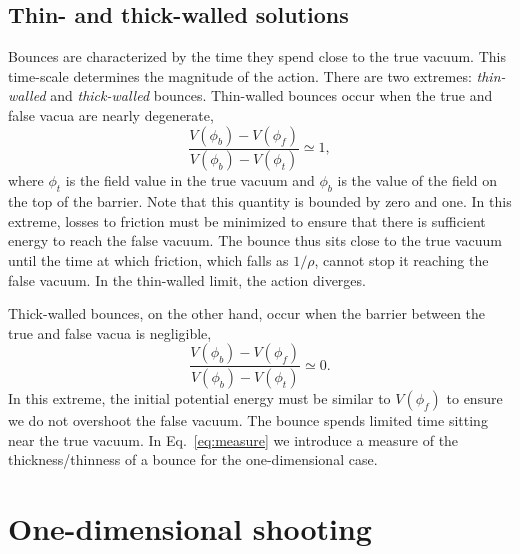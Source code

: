 \documentclass[final,3p,11pt,pdflatex]{elsarticle}
\renewcommand{\refeq}[1]{Eq.~\ref{#1}}
\newcommand{\fv}{\ensuremath{\phi_f}}
\newcommand{\tv}{\ensuremath{\phi_t}}
\newcommand{\barrier}{\ensuremath{\phi_b}}
\begin{document}
\subsection{Thin- and thick-walled solutions}

Bounces are characterized by the time they spend close to the true vacuum.  This time-scale determines the magnitude of the action. There are two extremes: \emph{thin-walled} and \emph{thick-walled} bounces.  Thin-walled bounces occur when the true and false vacua are nearly degenerate,
\begin{equation}
\frac{V(\barrier) - V(\fv)}{V(\barrier) - V(\tv)} \simeq 1,
\end{equation}
where $\tv$ is the field value in the true vacuum and $\barrier$ is the value
of the field on the top of the barrier.  Note that this quantity is bounded by
zero and one.  In this extreme, losses to friction must be minimized to ensure
that there is sufficient energy to reach the false vacuum.  The bounce thus
sits close to the true vacuum until the time at which friction, which falls as
$1/\rho$, cannot stop it reaching the false vacuum. In the thin-walled limit,
the action diverges.

Thick-walled bounces, on the other hand, occur when the barrier between the
true and false vacua is negligible,
\begin{equation}
\frac{V(\barrier) - V(\fv)}{V(\barrier) - V(\tv)} \simeq 0.
\end{equation}
In this extreme, the initial potential energy must be similar to $V(\fv)$ to
ensure we do not overshoot the false vacuum.  The bounce spends limited time
sitting near the true vacuum. In \refeq{eq:measure} we introduce a measure of
the thickness/thinness of a bounce for the one-dimensional case.

\section{One-dimensional shooting}\label{sec:shooting}
\end{document}
